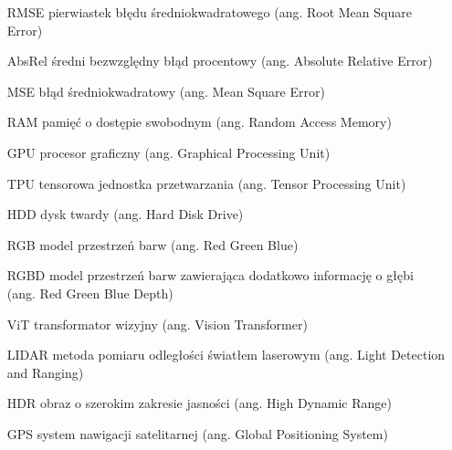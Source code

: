 \flushleft



\begin{itemize}[noitemsep,topsep=0pt,parsep=0pt,partopsep=0pt,labelwidth=3cm,align=left,itemindent=3cm]
\item[RMSE] pierwiastek błędu średniokwadratowego (ang. Root Mean Square Error)
    \item[AbsRel] średni bezwzględny błąd procentowy (ang. Absolute Relative Error)
    \item[MSE] błąd średniokwadratowy (ang. Mean Square Error)
    \item[RAM] pamięć o dostępie swobodnym (ang. Random Access Memory)
    \item[GPU] procesor graficzny (ang. Graphical Processing Unit)
    \item[TPU] tensorowa jednostka przetwarzania (ang. Tensor Processing Unit)
    \item[HDD] dysk twardy (ang. Hard Disk Drive)
    \item[RGB] model przestrzeń barw (ang. Red Green Blue)
    \item[RGBD] model przestrzeń barw zawierająca dodatkowo informację o głębi (ang. Red Green Blue Depth)
    \item[ViT] transformator wizyjny (ang. Vision Transformer)
    \item[LIDAR] metoda pomiaru odległości światłem laserowym (ang. Light Detection and Ranging)
    \item[HDR] obraz o szerokim zakresie jasności (ang. High Dynamic Range)
    \item[GPS] system nawigacji satelitarnej (ang. Global Positioning System)
\end{itemize}

